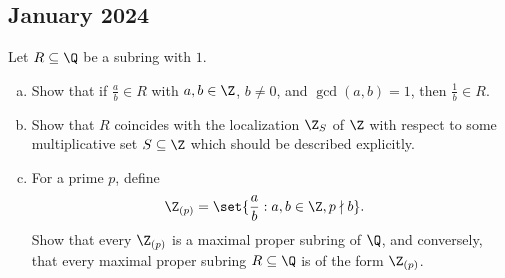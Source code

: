 \documentclass[10pt]{mypackage}
\begin{document}
\subsection{January 2024}%
\begin{problem}[Problem 1]
  Let $R\subseteq \Q$ be a subring with $1$.
  \begin{enumerate}[(a)]
    \item Show that if $\frac{a}{b}\in R$ with $a,b\in \Z$, $b\neq 0$, and $\gcd\left( a,b \right) = 1$, then $\frac{1}{b}\in R$.
    \item Show that $R$ coincides with the localization $\Z_S$ of $\Z$ with respect to some multiplicative set $S\subseteq \Z$ which should be described explicitly.
    \item For a prime $p$, define
      \begin{align*}
        \Z_{(p)} &= \set{\frac{a}{b} : a,b\in \Z,p\nmid b}.
      \end{align*}
      Show that every $\Z_{(p)}$ is a maximal proper subring of $\Q$, and conversely, that every maximal proper subring $R\subseteq \Q$ is of the form $\Z_{(p)}$.
  \end{enumerate}
\end{problem}
\end{document}
